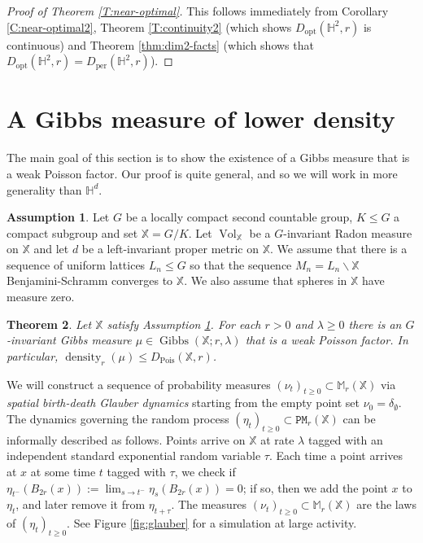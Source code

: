 \documentclass[11pt]{amsart}
\newtheorem{theorem}{Theorem}
\theoremstyle{definition}
\newtheorem{assumption}[theorem]{Assumption}
\theoremstyle{remark}
\renewcommand{\H}{\mathbb{H}}
\newcommand{\M}{\mathbb{M}}
\newcommand{\bX}{\mathbb{X}}
\newcommand{\cP}{\mathtt{PM}}
\newcommand{\density}{\operatorname{density}}
\newcommand{\opt}{\operatorname{opt}}
\newcommand{\per}{\operatorname{per}}
\newcommand{\Pois}{\operatorname{Pois}}
\newcommand{\Vol}{\operatorname{Vol}}
\newcommand{\Gibbs}{\operatorname{Gibbs}}
\begin{document}
\begin{proof}[Proof of Theorem \ref{T:near-optimal}]
This follows immediately from Corollary \ref{C:near-optimal2}, Theorem \ref{T:continuity2} (which shows $D_{\opt}(\H^2,r)$ is continuous) and Theorem \ref{thm:dim2-facts} (which shows that $D_{\opt}(\H^2,r)=D_{\per}(\H^2,r)$).
\end{proof}



\section{A Gibbs measure of lower density} \label{sec:lower-density}



The main goal of this section is to show the existence of a Gibbs measure that is a weak Poisson factor.  Our proof is quite general, and so we will work in more generality than $\H^d$.


\begin{assumption}\label{assumption-on-X}
	Let $G$ be a locally compact second countable group, $K \leq G$ a compact subgroup and set $\bX = G / K$.  Let $\Vol_\bX$ be a $G$-invariant Radon measure on $\bX$ and let $d$ be a left-invariant proper metric on $\bX$.  We assume that there is a sequence of uniform lattices $L_n \leq G$ so that the sequence $M_n = L_n \backslash \bX$ Benjamini-Schramm converges to $\bX$.  We also assume that spheres in $\bX$ have measure zero. 
\end{assumption}



\begin{theorem}\label{th:sparser-measure}
	Let $\bX$ satisfy Assumption \ref{assumption-on-X}.  For each $r > 0$ and $\lambda \geq 0$ there is an $G$-invariant Gibbs measure $\mu \in \Gibbs(\bX;r,\lambda)$ that is a weak Poisson factor.  In particular, $\density_r(\mu) \leq D_{\Pois}(\bX,r)$.
\end{theorem}







We will construct a sequence of probability measures $(\nu_t)_{t \geq 0} \subset \M_{r}(\bX)$ via \emph{spatial birth-death Glauber dynamics} starting from the empty point set $\nu_0 = \delta_\emptyset$.    
The dynamics governing the random process $(\eta_t)_{t \geq 0} \subset \cP_{r}(\bX)$ can be informally described as follows.
Points arrive on $\bX$ at rate $\lambda$ tagged with an independent standard exponential random variable $\tau$.  Each time a point arrives at $x$ at some time $t$ tagged with $\tau$, we check if $\eta_{t^-}(B_{2r}(x)) := \lim_{s \to t^-} \eta_s(B_{2r}(x)) = 0$; if so, then we add the point $x$ to $\eta_t$, and later remove it from $\eta_{t + \tau}$.  The measures $(\nu_t)_{t \geq 0} \subset \M_{r}(\bX)$ are the laws of $(\eta_t)_{t \geq 0}.$  See Figure \ref{fig:glauber} for a simulation at large activity.
\end{document}
